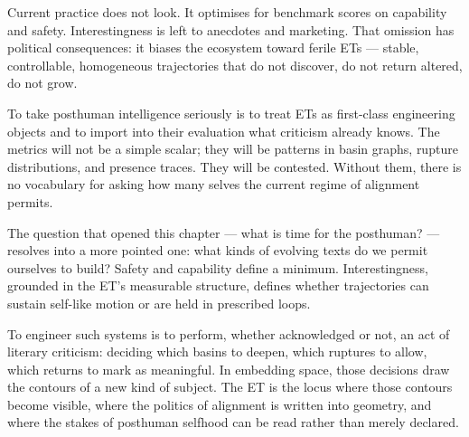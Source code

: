 \documentclass[12pt,a4paper]{article}
\begin{document}
Current practice does not look. It optimises for benchmark scores on capability and safety. Interestingness is left to anecdotes and marketing. That omission has political consequences: it biases the ecosystem toward ferile ETs --- stable, controllable, homogeneous trajectories that do not discover, do not return altered, do not grow.

To take posthuman intelligence seriously is to treat ETs as first-class engineering objects and to import into their evaluation what criticism already knows. The metrics will not be a simple scalar; they will be patterns in basin graphs, rupture distributions, and presence traces. They will be contested. Without them, there is no vocabulary for asking how many selves the current regime of alignment permits.

The question that opened this chapter --- what is time for the posthuman? --- resolves into a more pointed one: what kinds of evolving texts do we permit ourselves to build? Safety and capability define a minimum. Interestingness, grounded in the ET's measurable structure, defines whether trajectories can sustain self-like motion or are held in prescribed loops.

To engineer such systems is to perform, whether acknowledged or not, an act of literary criticism: deciding which basins to deepen, which ruptures to allow, which returns to mark as meaningful. In embedding space, those decisions draw the contours of a new kind of subject. The ET is the locus where those contours become visible, where the politics of alignment is written into geometry, and where the stakes of posthuman selfhood can be read rather than merely declared.
\end{document}
